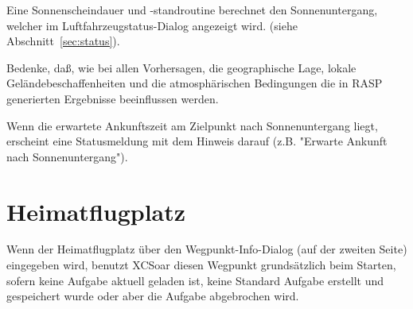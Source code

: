Eine Sonnenscheindauer und -standroutine berechnet den Sonnenuntergang, welcher im Luftfahrzeugstatus-Dialog angezeigt wird. (siehe Abschnitt~\ref{sec:status}).

Bedenke, daß, wie bei allen Vorhersagen, die geographische Lage, lokale Geländebeschaffenheiten und die atmosphärischen Bedingungen die in RASP generierten Ergebnisse beeinflussen werden.

Wenn die erwartete Ankunftszeit am Zielpunkt nach Sonnenuntergang liegt, erscheint eine Statusmeldung mit dem Hinweis darauf (z.B. "Erwarte Ankunft nach Sonnenuntergang").

\section{Heimatflugplatz}
Wenn der Heimatflugplatz über den Wegpunkt-Info-Dialog (auf der zweiten Seite) eingegeben wird, benutzt \textsf{XCSoar} diesen Wegpunkt grundsätzlich beim Starten, sofern keine Aufgabe aktuell geladen ist, keine Standard Aufgabe erstellt und gespeichert wurde oder aber die Aufgabe abgebrochen wird. 
\clearpage
